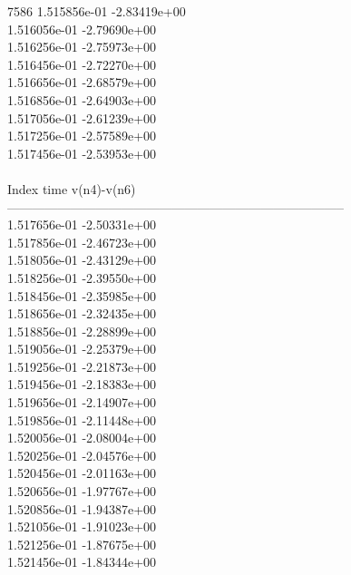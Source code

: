 7586	1.515856e-01	-2.83419e+00	\\ 	1.516056e-01	-2.79690e+00	\\ 	1.516256e-01	-2.75973e+00	\\ 	1.516456e-01	-2.72270e+00	\\ 	1.516656e-01	-2.68579e+00	\\ 	1.516856e-01	-2.64903e+00	\\ 	1.517056e-01	-2.61239e+00	\\ 	1.517256e-01	-2.57589e+00	\\ 	1.517456e-01	-2.53953e+00	\\ \hline
\\ \hline
Index   time            v(n4)-v(n6)     \\ \hline
--------------------------------------------------------------------------------\\ 	1.517656e-01	-2.50331e+00	\\ 	1.517856e-01	-2.46723e+00	\\ 	1.518056e-01	-2.43129e+00	\\ 	1.518256e-01	-2.39550e+00	\\ 	1.518456e-01	-2.35985e+00	\\ 	1.518656e-01	-2.32435e+00	\\ 	1.518856e-01	-2.28899e+00	\\ 	1.519056e-01	-2.25379e+00	\\ 	1.519256e-01	-2.21873e+00	\\ 	1.519456e-01	-2.18383e+00	\\ 	1.519656e-01	-2.14907e+00	\\ 	1.519856e-01	-2.11448e+00	\\ 	1.520056e-01	-2.08004e+00	\\ 	1.520256e-01	-2.04576e+00	\\ 	1.520456e-01	-2.01163e+00	\\ 	1.520656e-01	-1.97767e+00	\\ 	1.520856e-01	-1.94387e+00	\\ 	1.521056e-01	-1.91023e+00	\\ 	1.521256e-01	-1.87675e+00	\\ 	1.521456e-01	-1.84344e+00	\\ \hline
